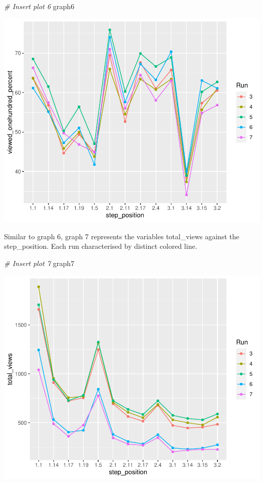 \documentclass[12pt,]{article}
\newenvironment{Shaded}{\begin{snugshade}}{\end{snugshade}}
\newcommand{\CommentTok}[1]{\textcolor[rgb]{0.56,0.35,0.01}{\textit{#1}}}
\newcommand{\NormalTok}[1]{#1}
\begin{document}
\begin{Shaded}
\begin{Highlighting}[]
\CommentTok{\# Insert plot 6}
\NormalTok{graph6}
\end{Highlighting}
\end{Shaded}

\begin{center}\includegraphics{report_files/figure-latex/unnamed-chunk-23-1} \end{center}

Similar to graph 6, graph 7 represents the variables total\_views
against the step\_position. Each run characterised by distinct colored
line.

\begin{Shaded}
\begin{Highlighting}[]
\CommentTok{\# Insert plot 7}
\NormalTok{graph7}
\end{Highlighting}
\end{Shaded}

\begin{center}\includegraphics{report_files/figure-latex/unnamed-chunk-24-1} \end{center}
\end{document}
